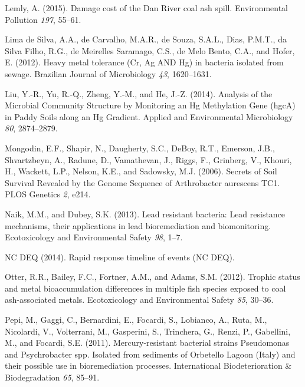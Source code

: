 \documentclass[ms, hidelinks]{uncgdissertationexp}
\theoremstyle{plain}
\theoremstyle{definition}
\theoremstyle{remark}
\begin{document}
\leavevmode\hypertarget{ref-lemlyDamageCostDan2015}{}%
Lemly, A. (2015). Damage cost of the Dan River coal ash spill. Environmental Pollution \emph{197}, 55--61.

\leavevmode\hypertarget{ref-limadesilvaHeavyMetalTolerance2012}{}%
Lima de Silva, A.A., de Carvalho, M.A.R., de Souza, S.A.L., Dias, P.M.T., da Silva Filho, R.G., de Meirelles Saramago, C.S., de Melo Bento, C.A., and Hofer, E. (2012). Heavy metal tolerance (Cr, Ag AND Hg) in bacteria isolated from sewage. Brazilian Journal of Microbiology \emph{43}, 1620--1631.

\leavevmode\hypertarget{ref-liuAnalysisMicrobialCommunity2014}{}%
Liu, Y.-R., Yu, R.-Q., Zheng, Y.-M., and He, J.-Z. (2014). Analysis of the Microbial Community Structure by Monitoring an Hg Methylation Gene (hgcA) in Paddy Soils along an Hg Gradient. Applied and Environmental Microbiology \emph{80}, 2874--2879.

\leavevmode\hypertarget{ref-mongodinSecretsSoilSurvival2006}{}%
Mongodin, E.F., Shapir, N., Daugherty, S.C., DeBoy, R.T., Emerson, J.B., Shvartzbeyn, A., Radune, D., Vamathevan, J., Riggs, F., Grinberg, V., Khouri, H., Wackett, L.P., Nelson, K.E., and Sadowsky, M.J. (2006). Secrets of Soil Survival Revealed by the Genome Sequence of Arthrobacter aurescens TC1. PLOS Genetics \emph{2}, e214.

\leavevmode\hypertarget{ref-naikLeadResistantBacteria2013}{}%
Naik, M.M., and Dubey, S.K. (2013). Lead resistant bacteria: Lead resistance mechanisms, their applications in lead bioremediation and biomonitoring. Ecotoxicology and Environmental Safety \emph{98}, 1--7.

\leavevmode\hypertarget{ref-ncdeqRapidResponseTimeline2014}{}%
NC DEQ (2014). Rapid response timeline of events (NC DEQ).

\leavevmode\hypertarget{ref-otterTrophicStatusMetal2012}{}%
Otter, R.R., Bailey, F.C., Fortner, A.M., and Adams, S.M. (2012). Trophic status and metal bioaccumulation differences in multiple fish species exposed to coal ash-associated metals. Ecotoxicology and Environmental Safety \emph{85}, 30--36.

\leavevmode\hypertarget{ref-pepiMercuryresistantBacterialStrains2011}{}%
Pepi, M., Gaggi, C., Bernardini, E., Focardi, S., Lobianco, A., Ruta, M., Nicolardi, V., Volterrani, M., Gasperini, S., Trinchera, G., Renzi, P., Gabellini, M., and Focardi, S.E. (2011). Mercury-resistant bacterial strains Pseudomonas and Psychrobacter spp. Isolated from sediments of Orbetello Lagoon (Italy) and their possible use in bioremediation processes. International Biodeterioration \& Biodegradation \emph{65}, 85--91.
\end{document}
